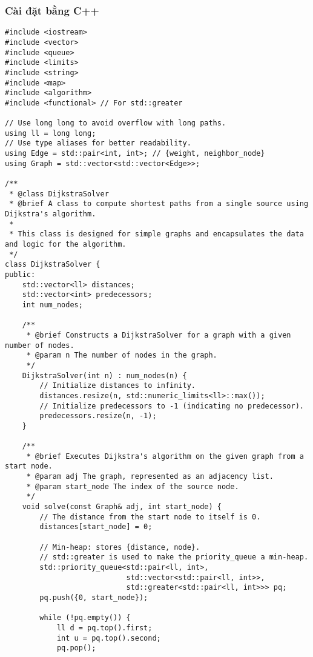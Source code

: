 \documentclass[a4paper,12pt]{article}
\begin{document}
\subsubsection{Cài đặt bằng C++}
\begin{lstlisting}[style=cppstyle, caption={Cài đặt Dijkstra bằng C++ sử dụng lớp và truy vết.}, label={lst:cpp}]
#include <iostream>
#include <vector>
#include <queue>
#include <limits>
#include <string>
#include <map>
#include <algorithm>
#include <functional> // For std::greater

// Use long long to avoid overflow with long paths.
using ll = long long;
// Use type aliases for better readability.
using Edge = std::pair<int, int>; // {weight, neighbor_node}
using Graph = std::vector<std::vector<Edge>>;

/**
 * @class DijkstraSolver
 * @brief A class to compute shortest paths from a single source using Dijkstra's algorithm.
 *
 * This class is designed for simple graphs and encapsulates the data and logic for the algorithm.
 */
class DijkstraSolver {
public:
    std::vector<ll> distances;
    std::vector<int> predecessors;
    int num_nodes;

    /**
     * @brief Constructs a DijkstraSolver for a graph with a given number of nodes.
     * @param n The number of nodes in the graph.
     */
    DijkstraSolver(int n) : num_nodes(n) {
        // Initialize distances to infinity.
        distances.resize(n, std::numeric_limits<ll>::max());
        // Initialize predecessors to -1 (indicating no predecessor).
        predecessors.resize(n, -1);
    }

    /**
     * @brief Executes Dijkstra's algorithm on the given graph from a start node.
     * @param adj The graph, represented as an adjacency list.
     * @param start_node The index of the source node.
     */
    void solve(const Graph& adj, int start_node) {
        // The distance from the start node to itself is 0.
        distances[start_node] = 0;
        
        // Min-heap: stores {distance, node}.
        // std::greater is used to make the priority_queue a min-heap.
        std::priority_queue<std::pair<ll, int>, 
                            std::vector<std::pair<ll, int>>, 
                            std::greater<std::pair<ll, int>>> pq;
        pq.push({0, start_node});

        while (!pq.empty()) {
            ll d = pq.top().first;
            int u = pq.top().second;
            pq.pop();


\end{lstlisting}
\end{document}
